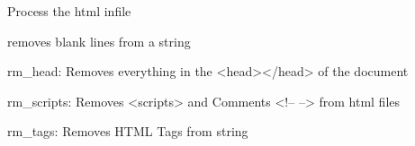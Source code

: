 \documentclass[letterpaper,10pt,english]{sphinxmanual}
\begin{document}

\begin{fulllineitems}
\label{theseus:theseus.processor.text2tag.process}
Process the html infile

\end{fulllineitems}


\begin{fulllineitems}
\label{theseus:theseus.processor.text2tag.rm_blank_lines}
removes blank lines from a string

\end{fulllineitems}


\begin{fulllineitems}
\label{theseus:theseus.processor.text2tag.rm_head}
rm\_head: Removes everything in the \textless{}head\textgreater{}\textless{}/head\textgreater{} of the document

\end{fulllineitems}


\begin{fulllineitems}
\label{theseus:theseus.processor.text2tag.rm_scripts}
rm\_scripts: Removes \textless{}scripts\textgreater{} and Comments \textless{}!-- --\textgreater{} from html files

\end{fulllineitems}


\begin{fulllineitems}
\label{theseus:theseus.processor.text2tag.rm_tags}
rm\_tags: Removes HTML Tags from string

\end{fulllineitems}
\end{document}
